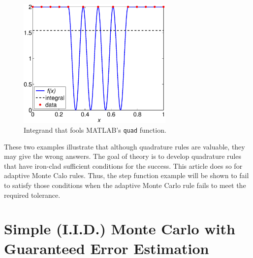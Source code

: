 \documentclass[graybox]{svmult}
\begin{document}
\begin{figure}
\centering
\includegraphics[width=3in]{FoolQuadFunction.eps}
\caption{Integrand that fools MATLAB's {\tt quad} function. \label{foolquadfig}}
\end{figure}

These two examples illustrate that although quadrature rules are valuable, they may give the wrong answers.  The goal of theory is to develop quadrature rules that have iron-clad sufficient conditions for the success.   This article does so for adaptive Monte Calo rules.  Thus, the step function example will be shown to fail to satisfy those conditions when the adaptive Monte Carlo rule fails to meet the required tolerance.

\section{Simple (I.I.D.) Monte Carlo with Guaranteed Error Estimation}
\end{document}
